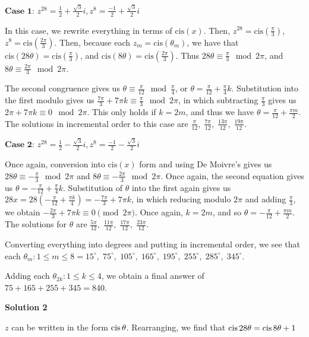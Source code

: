 \begin{enumerate}
 $\textbf{Case 1:}$ $z^{28}=\frac{1}{2} + \frac{\sqrt{3}}{2}i, z^8=\frac{-1}{2}+\frac{\sqrt{3}}{2}i$

 In this case, we rewrite everything in terms of $\text{cis}(x)$. Then, $z^{28} = \text{cis}(\frac{\pi}{3})$, $z^8=\text{cis}(\frac{2\pi}{3})$. Then, because each $z_m = \text{cis}(\theta_m)$, we have that $\text{cis}(28\theta)=\text{cis}(\frac{\pi}{3})$, and $\text{cis}(8\theta)=\text{cis}(\frac{2\pi}{3})$. Thus $28\theta \equiv \frac{\pi}{3} \mod 2\pi$, and $8\theta \equiv \frac{2\pi}{3} \mod 2\pi$.

 The second congruence gives us $\theta \equiv \frac{\pi}{12} \mod \frac{\pi}{4}$, or $\theta = \frac{\pi}{12} + \frac{\pi}{4}k$. Substitution into the first modulo gives us $\frac{7\pi}{3} + 7\pi k \equiv \frac{\pi}{3} \mod 2\pi$, in which subtracting $\frac{\pi}{3}$ gives us $2\pi+7\pi k\equiv 0 \mod 2\pi$. This only holds if $k=2m$, and thus we have $\theta = \frac{\pi}{12} + \frac{\pi m}{2}$. The solutions in incremental order to this case are $\frac{\pi}{12},\; \frac{7\pi}{12},\; \frac{13\pi}{12},\; \frac{19\pi}{12}$.

 $\textbf{Case 2:}$ $z^{28}=\frac{1}{2} - \frac{\sqrt{3}}{2}i, z^8=\frac{-1}{2}-\frac{\sqrt{3}}{2}i$

 Once again, conversion into $\text{cis}(x)$ form and using De Moivre's gives us $28\theta \equiv -\frac{\pi}{3} \mod 2\pi$ and $8\theta \equiv -\frac{2\pi}{3} \mod 2\pi$. Once again, the second equation gives us $\theta = -\frac{\pi}{12} + \frac{\pi}{4}k$. Substitution of $\theta$ into the first again gives us $28x=28(-\frac{\pi}{12} + \frac{\pi k}{4})=-\frac{7\pi}{3}+7\pi k$, in which reducing modulo $2\pi$ and adding $\frac{\pi}{3}$, we obtain $-\frac{2\pi}{3}+7\pi k \equiv 0 \pmod{2\pi}$. Once again, $k=2m$, and so $\theta = -\frac{\pi}{12} + \frac{\pi m}{2}$. The solutions for $\theta$ are $\frac{5\pi}{12},\;\frac{11\pi}{12},\; \frac{17\pi}{12},\; \frac{23\pi}{12}$.

 Converting everything into degrees and putting in incremental order, we see that each $\theta_m : 1\le m\le 8 = 15^\circ,\;75^\circ,\;105^\circ,\;165^\circ,\;195^\circ,\;255^\circ,\;285^\circ,\;345^\circ$.

 Adding each $\theta_{2k} : 1 \le k \le 4$, we obtain a final answer of $75+165+255+345 = \boxed{840}$.

 



\textbf{Solution 2}

$z$ can be written in the form $\text{cis\,}\theta$. Rearranging, we find that  $\text{cis\,}{28}\theta = \text{cis\,}{8}\theta+1$


\end{enumerate}
